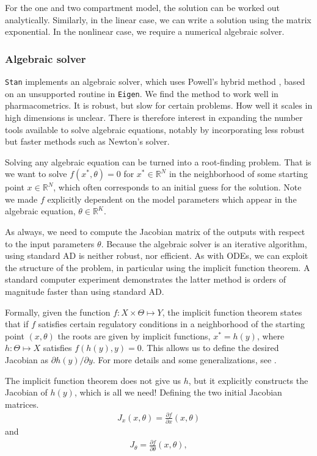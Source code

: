 \documentclass[11pt]{article}
\begin{document}
For the one and two compartment model, the solution can be worked out analytically. Similarly,
in the linear case, we can write a solution using the matrix exponential. In the nonlinear
case, we require a numerical algebraic solver.

\subsubsection{Algebraic solver}

\texttt{Stan} implements an algebraic solver, which uses Powell's hybrid method \cite{Powell:1970},
based on an unsupported routine in \texttt{Eigen}.
We find the method to work well in pharmacometrics.
It is robust, but slow for certain problems.
How well it scales in high dimensions is unclear.
There is therefore interest in expanding the number tools available to solve algebraic equations,
notably by incorporating less robust but faster methods such as Newton's solver.

Solving any algebraic equation can be turned into a root-finding problem. That is we want
to solve $f(x^*, \theta) = 0$ for $x^* \in \mathbb{R}^N$ in the neighborhood of some starting 
point $x \in \mathbb{R}^N$, which often corresponds to an initial guess for the solution. Note we
made $f$ explicitly dependent on the model parameters which appear in the algebraic
equation, $\theta \in \mathbb{R}^K$.

As always, we need to compute the Jacobian matrix of the outputs with respect to the input
parameters $\theta$. Because the algebraic solver is an iterative algorithm,
using standard AD is neither robust, nor efficient.
As with ODEs, we can exploit the structure of the problem, in particular using the implicit function theorem.
A standard computer experiment demonstrates the latter method is orders of magnitude
faster than using standard AD. %

Formally, given the function $f: X \times \Theta \mapsto Y$, the implicit function theorem
states that if $f$ satisfies certain regulatory conditions in a neighborhood of the
starting point $(x, \theta)$ the roots are given by implicit functions, $x^* = h(y)$, where
$h:\Theta \mapsto X$ satisfies $f(h(y), y) = 0$. This allows us to define the desired
Jacobian as $\partial h(y) / \partial y$. For more details and some generalizations,
see \cite{Bell:2008}.

The implicit function theorem does not give us $h$, but it explicitly constructs 
the Jacobian of $h(y)$, which is all we need!
Defining the two initial Jacobian matrices.
%
\begin{eqnarray*}
J_x(x, \theta) = \frac{\partial f}{\partial x} (x, \theta)
\end{eqnarray*}
%
and
%
\begin{eqnarray*}
J_\theta = \frac{\partial f}{\partial \theta} (x, \theta),
\end{eqnarray*}
\end{document}
